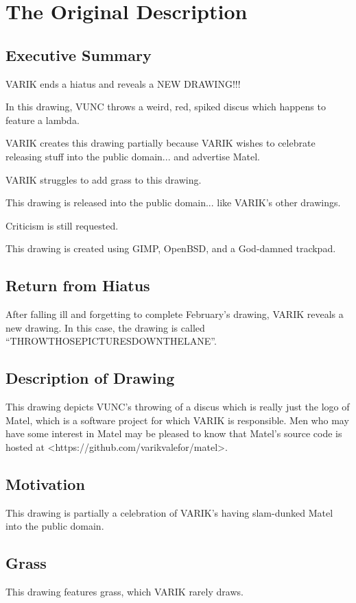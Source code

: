 \documentclass{report}
\begin{document}
\section{The Original Description}
\subsection{Executive Summary}
VARIK ends a hiatus and reveals a NEW DRAWING!!!

In this drawing, VUNC throws a weird, red, spiked discus which happens to feature a lambda.

VARIK creates this drawing partially because VARIK wishes to celebrate releasing stuff into the public domain... and advertise Matel.

VARIK struggles to add grass to this drawing.

This drawing is released into the public domain... like VARIK's other drawings.

Criticism is still requested.

This drawing is created using GIMP, OpenBSD, and a God-damned trackpad.

\subsection{Return from Hiatus}
After falling ill and forgetting to complete February's drawing, VARIK reveals a new drawing.  In this case, the drawing is called ``THROWTHOSEPICTURESDOWNTHELANE''.

\subsection{Description of Drawing}
This drawing depicts VUNC's throwing of a discus which is really just the logo of Matel, which is a software project for which VARIK is responsible.  Men who may have some interest in Matel may be pleased to know that Matel's source code is hosted at <https://github.com/varikvalefor/matel>.

\subsection{Motivation}
This drawing is partially a celebration of VARIK's having slam-dunked Matel into the public domain.

\subsection{Grass}
This drawing features grass, which VARIK rarely draws.
\end{document}
